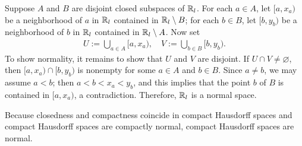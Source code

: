 \begin{exmp}[$\bb{R}_l$ is normal]
    Suppose $A$ and $B$ are disjoint closed subspaces of $\bb{R}_l$.
    For each $a\in A$, let $[a, x_a)$ be a neighborhood of $a$ in $\bb{R}_l$ contained in ${\mathbb{R}}_l\setminus B$; for each $b\in B$, let $[b, y_b)$ be a neighborhood of $b$ in $\bb{R}_l$ contained in ${\mathbb{R}}_l\setminus A$.
    Now set
    \begin{align*}
        U:=\bigcup_{a\in A}[a, x_a),\quad V:=\bigcup_{b\in B}[b, y_b).
    \end{align*}
    To show normality, it remains to show that $U$ and $V$ are disjoint.
    If $U\cap V\neq\varnothing$, then $[a, x_a)\cap[b, y_b)$ is nonempty for some $a\in A$ and $b\in B$.
    Since $a\neq b$, we may assume $a<b$; then $a<b<x_a<y_b$, and this implies that the point $b$ of $B$ is contained in $[a, x_a)$, a contradiction.
    Therefore, $\bb{R}_l$ is a normal space.
\end{exmp}

\begin{exmp}
    Because closedness and compactness coincide in compact Hausdorff spaces and compact Hausdorff spaces are compactly normal, compact Hausdorff spaces are normal.
\end{exmp}